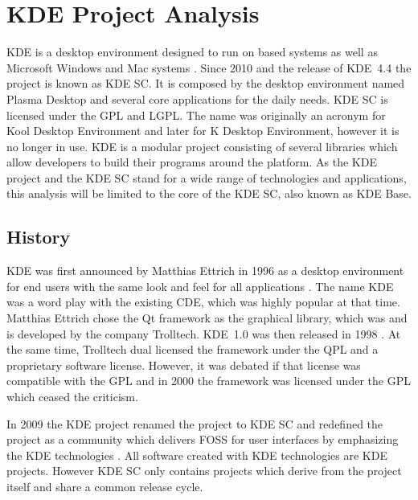 \section{KDE Project Analysis} %


\noindent KDE is a desktop environment designed to run on 
based systems as well as Microsoft Windows and Mac  systems
\cite{KDEPress,KDEAbout}. Since 2010 and the release of KDE~4.4 the project is
known as \ac{KDE SC}. It is composed by the desktop environment named Plasma
Desktop and several core applications for the daily needs. \ac{KDE SC} is
licensed under the \ac{GPL} and \ac{LGPL}. The name was originally an acronym
for Kool Desktop Environment and later for K Desktop Environment, however it is
no longer in use. KDE is a modular project consisting of several libraries
which allow developers to build their programs around the platform. As the KDE
project and the \ac{KDE SC} stand for a wide range of technologies and
applications, this analysis will be limited to the core of the \ac{KDE SC},
also known as KDE Base.

\subsection{History} %

KDE was first announced by Matthias Ettrich in 1996 as a desktop environment
for end users with the same look and feel for all applications
\cite{KDEAnnouncement}. The name KDE was a word play with the existing
\ac{CDE}, which was highly popular at that time. Matthias Ettrich chose the Qt
framework as the graphical library, which was and is developed by the company
Trolltech. KDE~1.0 was then released in 1998 \cite{KDEHistory}. At the same
time, Trolltech dual licensed the framework under the \ac{QPL} and a
proprietary software license. However, it was debated if that license was
compatible with the \ac{GPL} and in 2000 the framework was licensed under the
\ac{GPL} which ceased the criticism.

In 2009 the KDE project renamed the project to \ac{KDE SC} and redefined the
project as a community which delivers \ac{FOSS} for user interfaces by
emphasizing the KDE technologies \cite{KDESC}. All software created with KDE
technologies are KDE projects. However \ac{KDE SC} only contains projects which
derive from the project itself and share a common release cycle.

